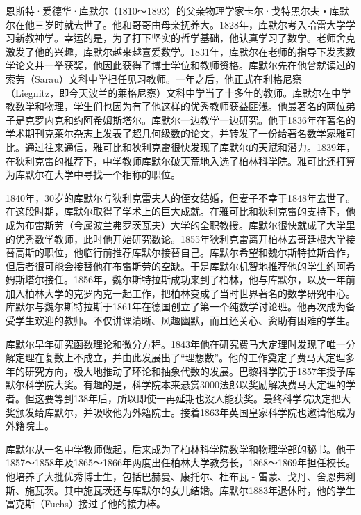 \documentclass[b5paper]{ctexart}
\begin{document}
\begin{mdframed}
恩斯特·爱德华·库默尔（1810～1893）的父亲物理学家卡尔·戈特黑尔夫・库默尔在他三岁时就去世了。他和哥哥由母亲抚养大。1828年，库默尔考入哈雷大学学习新教神学。幸运的是，为了打下坚实的哲学基础，他认真学习了数学。老师舍克激发了他的兴趣，库默尔越来越喜爱数学。1831年，库默尔在老师的指导下发表数学论文并一举获奖，他因此获得了博士学位和教师资格。库默尔先在他曾就读过的索劳（Sarau）文科中学担任见习教师。一年之后，他正式在利格尼察（Liegnitz，即今天波兰的莱格尼察）文科中学当了十多年的教师。库默尔在中学教数学和物理，学生们也因为有了他这样的优秀教师获益匪浅。他最著名的两位弟子是克罗内克和约阿希姆斯塔尔。库默尔一边教学一边研究。他于1836年在著名的学术期刊克莱尔杂志上发表了超几何级数的论文，并转发了一份给著名数学家雅可比。通过往来通信，雅可比和狄利克雷很快发现了库默尔的天赋和潜力。1839年，在狄利克雷的推荐下，中学教师库默尔破天荒地入选了柏林科学院。雅可比还打算为库默尔在大学中寻找一个相称的职位。

1840年，30岁的库默尔与狄利克雷夫人的侄女结婚，但妻子不幸于1848年去世了。在这段时期，库默尔取得了学术上的巨大成就。在雅可比和狄利克雷的支持下，他成为布雷斯劳（今属波兰弗罗茨瓦夫）大学的全职教授。库默尔很快就成了大学里的优秀数学教师，此时他开始研究数论。1855年狄利克雷离开柏林去哥廷根大学接替高斯的职位，他临行前推荐库默尔接替自己。库默尔希望和魏尔斯特拉斯合作，但后者很可能会接替他在布雷斯劳的空缺。于是库默尔机智地推荐他的学生约阿希姆斯塔尔接任。1856年，魏尔斯特拉斯成功来到了柏林，他与库默尔，以及一年前加入柏林大学的克罗内克一起工作，把柏林变成了当时世界著名的数学研究中心。库默尔与魏尔斯特拉斯于1861年在德国创立了第一个纯数学讨论班。他再次成为备受学生欢迎的教师。不仅讲课清晰、风趣幽默，而且还关心、资助有困难的学生。

库默尔早年研究函数理论和微分方程。1843年他在研究费马大定理时发现了唯一分解定理在复数上不成立，并由此发展出了“理想数”。他的工作奠定了费马大定理多年的研究方向，极大地推动了环论和抽象代数的发展。巴黎科学院于1857年授予库默尔科学院大奖。有趣的是，科学院本来悬赏3000法郎以奖励解决费马大定理的学者。但这要等到138年后，所以即使一再延期也没人能获奖。最终科学院决定把大奖颁发给库默尔，并吸收他为外籍院士。接着1863年英国皇家科学院也邀请他成为外籍院士。

库默尔从一名中学教师做起，后来成为了柏林科学院数学和物理学部的秘书。他于1857～1858年及1865～1866年两度出任柏林大学教务长，1868～1869年担任校长。他培养了大批优秀博士生，包括巴赫曼、康托尔、杜布瓦 - 雷蒙、戈丹、舍恩弗利斯、施瓦茨。其中施瓦茨还与库默尔的女儿结婚。库默尔1883年退休时，他的学生富克斯（Fuchs）接过了他的接力棒。
\end{mdframed}
\end{document}
